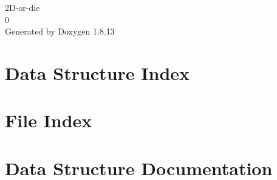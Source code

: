 \documentclass[twoside]{book}
\newcommand{\+}{\discretionary{\mbox{\scriptsize$\hookleftarrow$}}{}{}}
\newcommand{\clearemptydoublepage}{%
  \newpage{\pagestyle{empty}\cleardoublepage}%
}
\begin{document}
\hypersetup{pageanchor=false,
             bookmarksnumbered=true,
             pdfencoding=unicode
            }
\begin{titlepage}
\vspace*{7cm}
\begin{center}%
{\Large 2\+D-\/or-\/die \\[1ex]\large 0 }\\
\vspace*{1cm}
{\large Generated by Doxygen 1.8.13}\\
\end{center}
\end{titlepage}
\clearemptydoublepage
{}
\tableofcontents
\clearemptydoublepage
{}
\hypersetup{pageanchor=true}

\chapter{Data Structure Index}

\chapter{File Index}

\chapter{Data Structure Documentation}


























\end{document}
